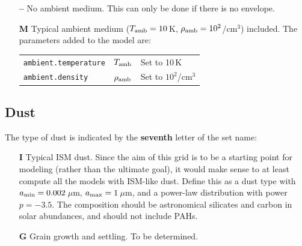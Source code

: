 \documentclass[10pt]{article}
\begin{document}
\begin{itemize}

\item[\textbf{--}] No ambient medium. This can only be done if there is no envelope.

\item[\textbf{M}] Typical ambient medium ($T_{\rm amb}=10$\,K, $\rho_{\rm amb}=10^2$/cm$^3$) included. The parameters added to the model are:

\begin{center}
  \begin{tabular}{llp{4in}}
    \texttt{ambient.temperature} & $T_{\rm amb}$ & Set to 10\,K \\
    \texttt{ambient.density} & $\rho_{\rm amb}$ & Set to $10^2$/cm$^3$ \\
  \end{tabular}
\end{center}

\end{itemize}

\subsection{Dust}

The type of dust is indicated by the \textbf{seventh} letter of the set name:

\begin{itemize}

\item[\textbf{I}] Typical ISM dust. Since the aim of this grid is to be a starting point for modeling (rather than the ultimate goal), it would make sense to at least compute all the models with ISM-like dust. Define this as a dust type with $a_{\rm min}=0.002$\,$\mu$m, $a_{\rm max}=1$\,$\mu$m, and a power-law distribution with power $p=-3.5$. The composition should be astronomical silicates and carbon in solar abundances, and should not include PAHs.

\item[\textbf{G}] Grain growth and settling. To be determined.



\end{itemize}
\end{document}
